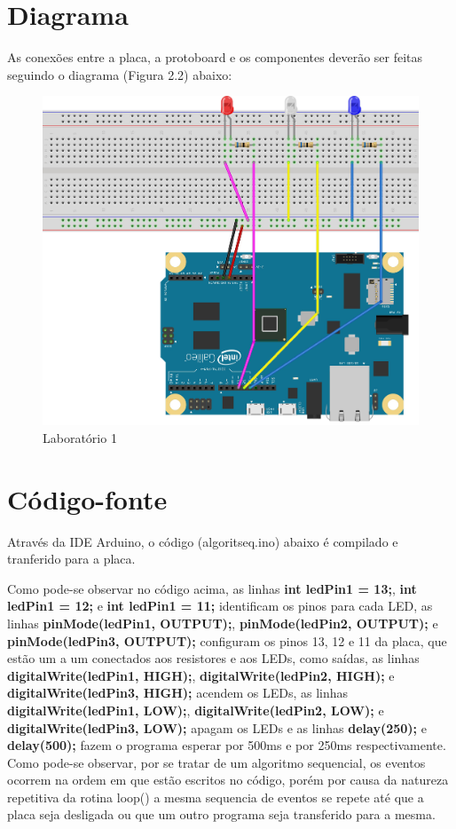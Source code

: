 \section{Diagrama}
\label{sec:2}

As conexões entre a placa, a protoboard e os componentes deverão ser feitas seguindo o diagrama (Figura 2.2) abaixo:

\begin{figure}[h]
\centering
\includegraphics[scale=0.8]{chapter2/algseq.jpg}
\caption{Laboratório 1}
\label{fig:2}
\end{figure}


\section{Código-fonte}
\label{sec:3}
Através da IDE Arduino, o código (algoritseq.ino) abaixo é compilado e tranferido para a placa.



Como pode-se observar no código acima, as linhas \textbf{int ledPin1 = 13;}, \textbf{int ledPin1 = 12;} e \textbf{int ledPin1 = 11;} identificam os pinos para cada LED, as linhas \textbf{pinMode(ledPin1, OUTPUT);}, \textbf{pinMode(ledPin2, OUTPUT);} e \textbf{pinMode(ledPin3, OUTPUT);} configuram os pinos 13, 12 e 11 da placa, que estão um a um conectados aos resistores e aos LEDs, como saídas, as linhas \textbf{digitalWrite(ledPin1, HIGH);}, \textbf{digitalWrite(ledPin2, HIGH);} e \textbf{digitalWrite(ledPin3, HIGH);} acendem os LEDs, as linhas \textbf{digitalWrite(ledPin1, LOW);}, \textbf{digitalWrite(ledPin2, LOW);} e \textbf{digitalWrite(ledPin3, LOW);} apagam os LEDs e as linhas \textbf{delay(250);} e \textbf{delay(500);} fazem o programa esperar por 500ms e por 250ms respectivamente. Como pode-se observar, por se tratar de um algoritmo sequencial, os eventos ocorrem na ordem em que estão escritos no código, porém por causa da natureza repetitiva da rotina loop() a mesma sequencia de eventos se repete até que a placa seja desligada ou que um outro programa seja transferido para a mesma.

